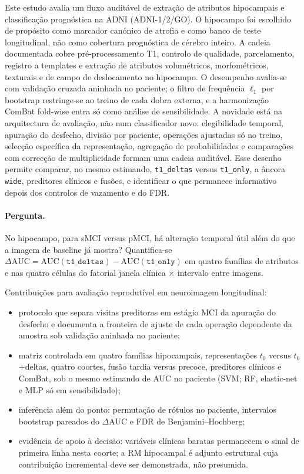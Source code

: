 \documentclass[review]{elsarticle}
\newcommand{\code}[1]{\texttt{#1}}
\begin{document}
	Este estudo avalia um fluxo auditável de extração de atributos hipocampais e classificação prognóstica na ADNI (ADNI-1/2/GO).
	O hipocampo foi escolhido de propósito como marcador canónico de atrofia e como banco de teste longitudinal, não como cobertura prognóstica de cérebro inteiro.
	A cadeia documentada cobre pré-processamento T1, controlo de qualidade, parcelamento, registro a templates e extração de atributos volumétricos, morfométricos, texturais e de campo de deslocamento no hipocampo.
	O desempenho avalia-se com validação cruzada aninhada no paciente; o filtro de frequência $\ell_1$ por bootstrap restringe-se ao treino de cada dobra externa, e a harmonização ComBat fold-wise entra só como análise de sensibilidade.
	A novidade está na arquitectura de avaliação, não num classificador novo: elegibilidade temporal, apuração do desfecho, divisão por paciente, operações ajustadas só no treino, selecção específica da representação, agregação de probabilidades e comparações com correcção de multiplicidade formam uma cadeia auditável.
	Esse desenho permite comparar, no mesmo estimando, \code{t1\_deltas} versus \code{t1\_only}, a âncora \code{wide}, preditores clínicos e fusões, e identificar o que permanece informativo depois dos controlos de vazamento e do FDR.
	
	\paragraph{Pergunta.}
	No hipocampo, para sMCI versus pMCI, há alteração temporal útil além do que a imagem de baseline já mostra?
	Quantifica-se $\Delta\mathrm{AUC}=\mathrm{AUC}(\code{t1\_deltas})-\mathrm{AUC}(\code{t1\_only})$ em quatro famílias de atributos e nas quatro células do fatorial janela clínica $\times$ intervalo entre imagens.
	
	Contribuições para avaliação reprodutível em neuroimagem longitudinal:
	\begin{itemize}
		\item protocolo que separa visitas preditoras em estágio MCI da apuração do desfecho e documenta a fronteira de ajuste de cada operação dependente da amostra sob validação aninhada no paciente;
		\item matriz controlada em quatro famílias hipocampais, representações $t_0$ versus $t_0$+deltas, quatro coortes, fusão tardia versus precoce, preditores clínicos e ComBat, sob o mesmo estimando de AUC no paciente (SVM; RF, elastic-net e MLP só em sensibilidade);
		\item inferência além do ponto: permutação de rótulos no paciente, intervalos bootstrap pareados do $\Delta$AUC e FDR de Benjamini--Hochberg;
		\item evidência de apoio à decisão: variáveis clínicas baratas permanecem o sinal de primeira linha nesta coorte; a RM hipocampal é adjunto estrutural cuja contribuição incremental deve ser demonstrada, não presumida.
	\end{itemize}
	
\end{document}
